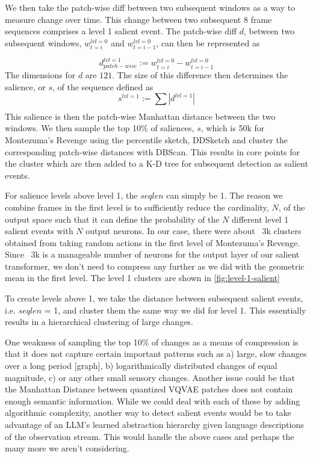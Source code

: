 \documentclass{article}
\begin{document}
We then take the patch-wise diff between two subsequent windows as a way to measure change over time. This change between two subsequent 8 frame sequences comprises a level 1 salient event. The patch-wise diff $d$, between two subsequent windows, $w^{lvl=0}_{t=i}$ and $w^{lvl=0}_{t=i-1}$, can then be represented as

\[
d^{lvl=1}_{patch-wise} :=  w^{lvl=0}_{t=i} - w^{lvl=0}_{t=i-1}
\]
The dimensions for $d$ are $121$. The size of this difference then determines the salience, or $s$, of the sequence defined as
\[
s^{lvl=1} := \sum_{} \left| d^{lvl=1} \right|
\]
This salience is then the patch-wise Manhattan distance between the two windows. We then sample the top 10\% of saliences,  $s$,  which is 50k for Montezuma's Revenge using the percentile sketch, DDSketch \cite{Masson_2019} and cluster the corresponding patch-wise distances with DBScan\cite{ester1996density}. This results in core points for the cluster which are then added to a K-D tree \cite{bentley1975multidimensional} for subsequent detection as salient events.

For salience levels above level 1, the $seqlen$ can simply be 1. The reason we combine frames in the first level is to sufficiently reduce the cardinality, $N$, of the output space such that it can define the probability of the $N$ different level 1 salient events with $N$ output neurons. In our case, there were about ~3k clusters obtained from taking random actions in the first level of Montezuma's Revenge. Since ~3k is a manageable number of neurons for the output layer of our salient transformer, we don't need to compress any further as we did with the geometric mean in the first level. The level 1 clusters are shown in \ref{fig:level-1-salient}

To create levels above 1, we take the distance between subsequent salient events, i.e. $seqlen$ = 1, and cluster them the same way we did for level 1. This essentially results in a hierarchical clustering of large changes.

One weakness of sampling the top 10\% of changes as a means of compression is that it does not capture certain important patterns such as a) large, slow changes over a long period [graph], b) logarithmically distributed changes of equal magnitude, c) or any other small sensory changes. Another issue could be that the Manhattan Distance between quantized VQVAE patches does not contain enough semantic information. While we could deal with each of these by adding algorithmic complexity, another way to detect salient events would be to take advantage of an LLM's learned abstraction hierarchy given language descriptions of the observation stream. This would handle the above cases and perhaps the many more we aren't considering.
\end{document}
